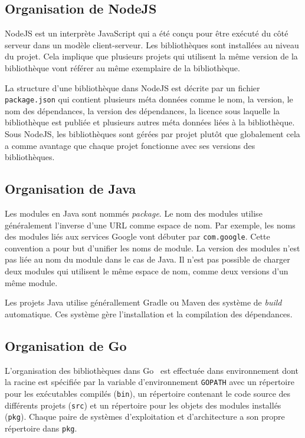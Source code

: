 
\subsection{Organisation de NodeJS}
%
NodeJS est un interprète JavaScript qui a été conçu pour être exécuté du côté
serveur dans un modèle client-serveur. Les bibliothèques sont installées au
niveau du projet. Cela implique que plusieurs projets qui utilisent la même
version de la bibliothèque vont référer au même exemplaire de la
bibliothèque.

La structure d'une bibliothèque dans NodeJS est décrite par un fichier
\texttt{package.json} qui contient plusieurs méta données comme
le nom, la version, le nom des dépendances, la version des dépendances,
la licence sous laquelle la bibliothèque est publiée et plusieurs autres
méta données liées à la bibliothèque. Sous NodeJS, les bibliothèques sont gérées
par projet plutôt que globalement cela a comme avantage que chaque projet
fonctionne avec ses versions des bibliothèques.

\subsection{Organisation de Java}
%
Les modules en Java sont nommés \textit{package}.  Le nom des modules utilise
généralement l'inverse d'une URL comme espace de nom. Par exemple, les noms des
modules liés aux services Google vont débuter par \texttt{com.google}. Cette
convention a pour but d'unifier les noms de module. La version des modules
n'est pas liée au nom du module dans le cas de Java. Il n'est pas possible de
charger deux modules qui utilisent le même espace de nom, comme deux versions
d'un même module.

Les projets Java utilise générallement Gradle ou Maven des système de
\textit{build} automatique. Ces système gère l'installation et la compilation
des dépendances.

\subsection{Organisation de Go}
%
L'organisation des bibliothèques dans Go~\cite{GoLang} est effectuée dans
environnement dont la racine est spécifiée par la variable d'environnement
\texttt{GOPATH} avec un répertoire pour les exécutables compilés
(\texttt{bin}), un répertoire contenant le code source des différents projets
(\texttt{src}) et un répertoire pour les objets des modules installés
(\texttt{pkg}). Chaque paire de systèmes d'exploitation et d'architecture a son
propre répertoire dans \texttt{pkg}.

